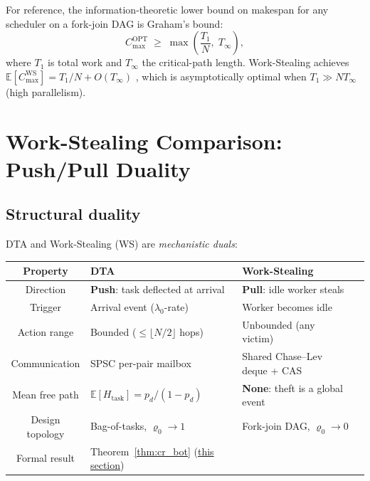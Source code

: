 \documentclass[11pt,a4paper]{article}
\begin{document}
For reference, the information-theoretic lower bound on makespan for
any scheduler on a fork-join DAG is Graham's bound:
\begin{equation}\label{eq:graham}
  C_{\max}^{\mathrm{OPT}} \;\ge\; \max\!\left(\frac{T_1}{N},\; T_\infty\right),
\end{equation}
where $T_1$ is total work and $T_\infty$ the critical-path length.
Work-Stealing achieves $\mathbb{E}[C_{\max}^{\mathrm{WS}}] = T_1/N + O(T_\infty)$
\cite{blumofe1999}, which is asymptotically optimal when $T_1 \gg N T_\infty$
(high parallelism).

\section{Work-Stealing Comparison: Push/Pull Duality}
\label{sec:ws_compare}

\subsection{Structural duality}

DTA and Work-Stealing (WS) are \emph{mechanistic duals}:

\medskip
\noindent
\begin{tabularx}{\textwidth}{@{}clXl@{}}
\toprule
Property & DTA & Work-Stealing \\
\midrule
Direction & \textbf{Push}: task deflected at arrival & \textbf{Pull}: idle worker steals \\
Trigger & Arrival event ($\lambda_0$-rate) & Worker becomes idle \\
Action range & Bounded ($\le \lfloor N/2 \rfloor$ hops) & Unbounded (any victim) \\
Communication & SPSC per-pair mailbox & Shared Chase--Lev deque + CAS \\
Mean free path & $\mathbb{E}[H_{\mathrm{task}}] = p_d/(1-p_d)$ & \textbf{None}: theft is a global event \\
Design topology & Bag-of-tasks, $\varrho_0 \to 1$ & Fork-join DAG, $\varrho_0 \to 0$ \\
Formal result & Theorem~\ref{thm:cr_bot} (\hyperref[chap:kinetic_theory]{this section}) & \cite{blumofe1999} \\
\bottomrule
\end{tabularx}

\medskip
\end{document}

